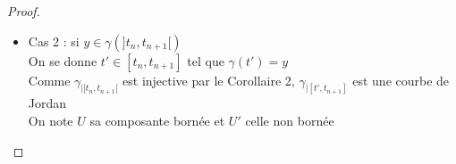 \documentclass{article}
\begin{document}
\begin{flushleft}
\begin{proof}
\begin{itemize}
        Montrons d'abord que $V \cap U$ est connexe par arcs
        \\~\\
        Pour cela, considérons $C_1$ et $C_2$ deux composantes connexes par arcs de $V \cap U$ et montrons qu'elles
        appartiennent à $C_{\gamma}(t_{n+1}) \backslash C_{\gamma}(t_n)$\\
        On mène pour cela une démonstration très similaire au Lemme d'apparition, en exploitant le fait que
        $\operatorname{Fr}(V \cap U) \cap V = \gamma(]t_n, t_{n+1}[)$ par construction
        \\~\\
        Par la Proposition 10, $\operatorname{Fr}(C_1) \cap \gamma(]t_n, t_{n+1}[) \neq \varnothing$ et de même pour $C_2$\\
        On se donne alors $t \leq t' \in ]t_n, t_{n+1}[$ tels que $\gamma(t)$ et $\gamma(t')$ appartiennent respectivement à ces
        intersections\\
        Comme $\gamma([t, t']) \subset V$ et est compact, on se donne $r > 0$ tel que pour tout point de $\gamma([t, t'])$,
        la boule centrée en ce point de rayon $r$ est incluse dans $V$\\
        Comme $\gamma(t)$ et $\gamma(t')$ sont des points frontière, il existe dans tout voisinage de ces points respectivement des
        points de $C_1$ ou $C_2$\\
        Par ce qui precède et la Proposition 7, il existe donc un chemin dans $V \cap U$ de $C_1$ à $C_2$ et donc $C_1 = C_2$\\
        $V \cap U$ est bien connexe par arcs et par le même raisonnement $V \cap U'$ également
        \\~\\
        Par la Proposition 5, comme ce sont des ouverts connexes par arc formant une partition de $V \backslash \gamma([t_n, t_{n+1}])$, il s'agit
        de ses composantes connexes par arc
        \\~\\
        \item Cas 2 : si $y \in \gamma(]t_n, t_{n+1}[)$\\
        On se donne $t' \in [t_n, t_{n+1}]$ tel que $\gamma(t') = y$\\
        Comme $\gamma_{\mid [t_n, t_{n+1}[}$ est injective par le Corollaire 2, $\gamma_{\mid [t', t_{n+1}]}$ est une courbe de Jordan\\
        On note $U$ sa composante bornée et $U'$ celle non bornée

\end{itemize}
\end{proof}
\end{flushleft}
\end{document}
